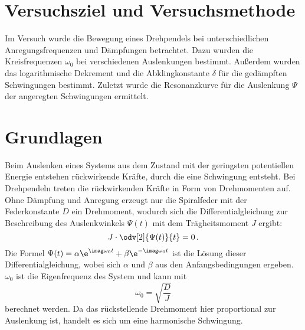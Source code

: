 \documentclass[
12pt,
a4paper,
bibliography=totocnumbered, %
BCOR=1cm, %
oneside, %
]{scrartcl}
\begin{document}
\thispagestyle{empty}



\thispagestyle{empty}

\tableofcontents

\clearpage %

\renewcommand{\thepage}{\arabic{page}}
\setcounter{page}{1}

\section[Versuchsziel]{Versuchsziel und Versuchsmethode}

Im Versuch wurde die Bewegung eines Drehpendels bei unterschiedlichen Anregungsfrequenzen und Dämpfungen betrachtet. Dazu wurden die Kreisfrequenzen \(\omega_0\) bei verschiedenen Auslenkungen bestimmt. Außerdem wurden das logarithmische Dekrement und die Abklingkonstante \(\delta\) für die gedämpften Schwingungen bestimmt. Zuletzt wurde die Resonanzkurve für die Auslenkung \(\Psi\) der angeregten Schwingungen ermittelt.

\section{Grundlagen}

Beim Auslenken eines Systems aus dem Zustand mit der geringsten potentiellen Energie entstehen rückwirkende Kräfte, durch die eine Schwingung entsteht. Bei Drehpendeln treten die rückwirkenden Kräfte in Form von Drehmomenten auf. Ohne Dämpfung und Anregung erzeugt nur die Spiralfeder mit der Federkonstante $D$ ein Drehmoment, wodurch sich die Differentialgleichung zur Beschreibung des Auslenkwinkels \(\Psi(t)\) mit dem Trägheitsmoment \(J\) ergibt:
\begin{equation}
	J \cdot \odv[2]{\Psi(t)}{t} = 0 \,.
\end{equation}
Die Formel \(\Psi(t) = \alpha \e^{\imag \omega_0 t} + \beta \e^{- \imag \omega_0 t}\) ist die Lösung dieser Differentialgleichung, wobei sich \(\alpha\) und \(\beta\) aus den Anfangsbedingungen ergeben. \(\omega_0\) ist die Eigenfrequenz des System und kann mit
\begin{equation}
	\omega_0 = \sqrt{\frac{D}{J}}
\end{equation}
berechnet werden. Da das rückstellende Drehmoment hier proportional zur Auslenkung ist, handelt es sich um eine harmonische Schwingung.
\end{document}
